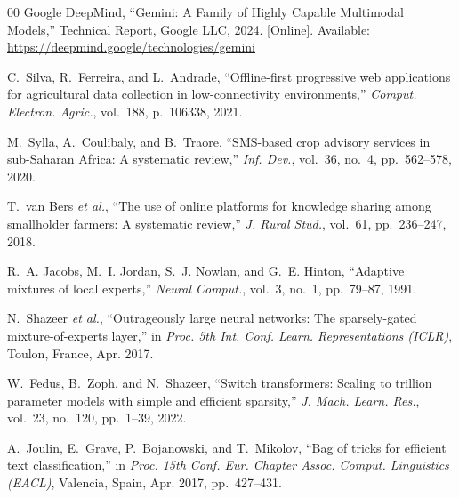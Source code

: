 \documentclass[conference]{IEEEtran}
\begin{document}
\begin{thebibliography}{00}
Google DeepMind,
``Gemini: A Family of Highly Capable Multimodal Models,''
Technical Report, Google LLC, 2024.
[Online]. Available: \url{https://deepmind.google/technologies/gemini}

C.~Silva, R.~Ferreira, and L.~Andrade,
``Offline-first progressive web applications for agricultural data
collection in low-connectivity environments,''
\textit{Comput. Electron. Agric.}, vol.~188, p.~106338, 2021.

M.~Sylla, A.~Coulibaly, and B.~Traore,
``SMS-based crop advisory services in sub-Saharan Africa: A systematic
review,''
\textit{Inf. Dev.}, vol.~36, no.~4, pp.~562--578, 2020.

T.~van Bers \textit{et al.},
``The use of online platforms for knowledge sharing among smallholder
farmers: A systematic review,''
\textit{J. Rural Stud.}, vol.~61, pp.~236--247, 2018.

R.~A. Jacobs, M.~I. Jordan, S.~J. Nowlan, and G.~E. Hinton,
``Adaptive mixtures of local experts,''
\textit{Neural Comput.}, vol.~3, no.~1, pp.~79--87, 1991.

N.~Shazeer \textit{et al.},
``Outrageously large neural networks: The sparsely-gated
mixture-of-experts layer,''
in \textit{Proc. 5th Int. Conf. Learn. Representations (ICLR)},
Toulon, France, Apr. 2017.

W.~Fedus, B.~Zoph, and N.~Shazeer,
``Switch transformers: Scaling to trillion parameter models with simple
and efficient sparsity,''
\textit{J. Mach. Learn. Res.}, vol.~23, no.~120, pp.~1--39, 2022.

A.~Joulin, E.~Grave, P.~Bojanowski, and T.~Mikolov,
``Bag of tricks for efficient text classification,''
in \textit{Proc. 15th Conf. Eur. Chapter Assoc. Comput. Linguistics
(EACL)}, Valencia, Spain, Apr. 2017, pp.~427--431.

\end{thebibliography}
\end{document}

